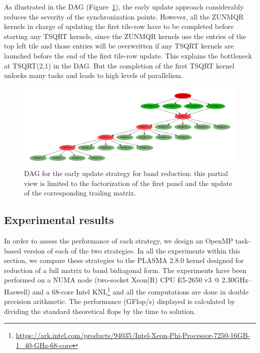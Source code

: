 As illustrated in the DAG (Figure~\ref{fig:dag_tile}),
the early update approach considerably reduces the severity of the
synchronization points.
However,
all the ZUNMQR kernels in charge of updating the
first tile-row have to be completed before starting
any TSQRT kernels,
since the ZUNMQR kernels use the entries of the top left tile and
those entries will be overwritten if any TSQRT kernels are
launched before the end of the first tile-row update.
This explains the bottleneck at TSQRT(2,1) in the DAG.
But the completion of the first TSQRT kernel unlocks many tasks
and leads to high levels of parallelism.


\begin{figure}[h!]
  \begin{center}
    \includegraphics[width=1\textwidth]{fig/dag_tile}
  \end{center}
  \caption{DAG for the early update strategy for band reduction:
    this partial view is limited to the factorization of the first panel and
    the update of the corresponding trailing matrix.}
  \label{fig:dag_tile}
\end{figure}

\subsection{Experimental results}
In order to assess the performance of each strategy,
we design an OpenMP task-based version of each of the two strategies.
In all the experiments within this section,
we compare these strategies to the PLASMA 2.8.0 kernel
designed for reduction of a full matrix to band bidiagonal form.
The experiments have been performed on a
NUMA node (two-socket Xeon(R) CPU E5-2650 v3 @ 2.30GHz--Haswell)
and a 68-core
Intel KNL\footnote{\url{https://ark.intel.com/products/94035/Intel-Xeon-Phi-Processor-7250-16GB-1\_40-GHz-68-core}}
and all the computations are done in double precision arithmetic.
The performance (GFlop/s) displayed is calculated by dividing the
standard theoretical flops by the time to solution.

